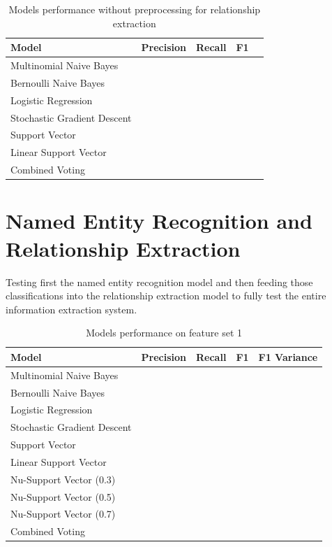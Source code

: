 \documentclass[11pt,oneside]{book}
\begin{document}
\begin{longtable}{|l|l|l|l|l|}
\caption{Models performance without preprocessing for relationship extraction}
\label{tab:re_feature_set_2}\\
\hline
\textbf{Model}          & \multicolumn{1}{c|}{\textbf{Precision}} & \multicolumn{1}{c|}{\textbf{Recall}} & \textbf{F1} \\ \hline
\endfirsthead
%
\endhead
%
Multinomial Naive Bayes &  &  &   \\ \hline
Bernoulli Naive Bayes       &  &  &   \\ \hline
Logistic Regression         &  &  &   \\ \hline
Stochastic Gradient Descent &  &  &   \\ \hline
Support Vector              &  &  &   \\ \hline
Linear Support Vector      &  &  &   \\ \hline
Combined Voting             &  &  &   \\ \hline
\end{longtable}

\section{Named Entity Recognition and Relationship Extraction}

Testing first the named entity recognition model and then feeding those classifications into the relationship extraction model to fully test the entire information extraction system.

\begin{longtable}{|l|l|l|l|l|}
\caption{Models performance on feature set 1}
\label{tab:ner_re_feature_set_1}\\
\hline
\textbf{Model}          & \multicolumn{1}{c|}{\textbf{Precision}} & \multicolumn{1}{c|}{\textbf{Recall}} & \textbf{F1} & \textbf{F1 Variance} \\ \hline
\endfirsthead
%
\endhead
%
Multinomial Naive Bayes & \multicolumn{1}{c|}{}                   & \multicolumn{1}{c|}{}                &             &                      \\ \hline
Bernoulli Naive Bayes       &  &  &  &  \\ \hline
Logistic Regression         &  &  &  &  \\ \hline
Stochastic Gradient Descent &  &  &  &  \\ \hline
Support Vector              &  &  &  &  \\ \hline
Linear Support Vector       &  &  &  &  \\ \hline
Nu-Support Vector (0.3)     &  &  &  &  \\ \hline
Nu-Support Vector (0.5)     &  &  &  &  \\ \hline
Nu-Support Vector (0.7)     &  &  &  &  \\ \hline
Combined Voting             &  &  &  &  \\ \hline
\end{longtable}
\end{document}
